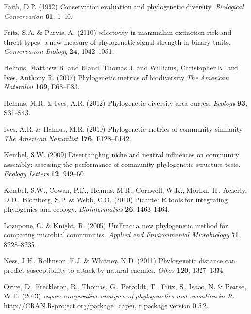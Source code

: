 \documentclass{bioinfo}
\begin{document}
\begin{thebibliography}{30}
Faith, D.P. (1992) Conservation evaluation and phylogenetic diversity.
  \emph{Biological Conservation} \textbf{61}, 1--10.

Fritz, S.A. \& Purvis, A. (2010) selectivity in mammalian extinction risk and
  threat types: a new measure of phylogenetic signal strength in binary traits.
  \emph{Conservation Biology} \textbf{24}, 1042--1051.

 Helmus, Matthew
  R. and Bland, Thomas J. and Williams, Christopher K. and Ives,
  Anthony R. (2007) Phylogenetic metrics of biodiversity \emph{The
    American Naturalist} \textbf{169}, E68--E83.

Helmus, M.R. \& Ives, A.R. (2012) Phylogenetic diversity-area curves.
  \emph{Ecology} \textbf{93}, S31--S43.

Ives, A.R. \& Helmus, M.R. (2010)
  Phylogenetic metrics of community similarity
  \emph{The American Naturalist} \textbf{176}, E128--E142.

Kembel, S.W. (2009) {Disentangling niche and neutral influences on community
  assembly: assessing the performance of community phylogenetic structure
  tests}. \emph{Ecology Letters} \textbf{12}, 949--60.

Kembel, S.W., Cowan, P.D., Helmus, M.R., Cornwell, W.K., Morlon, H., Ackerly,
  D.D., Blomberg, S.P. \& Webb, C.O. (2010) Picante: R tools for integrating
  phylogenies and ecology. \emph{Bioinformatics} \textbf{26}, 1463--1464.

Lozupone, C. \& Knight, R. (2005) {UniFrac}: a new phylogenetic method for
  comparing microbial communities. \emph{Applied and Environmental
  Microbiology} \textbf{71}, 8228--8235.

Ness, J.H., Rollinson, E.J. \& Whitney, K.D. (2011) Phylogenetic distance can
  predict susceptibility to attack by natural enemies. \emph{Oikos}
  \textbf{120}, 1327--1334.

Orme, D., Freckleton, R., Thomas, G., Petzoldt, T., Fritz, S., Isaac, N. \&
  Pearse, W.D. (2013) \emph{caper: comparative analyses of phylogenetics and
  evolution in {R}}. \urlprefix\url{http://CRAN.R-project.org/package=caper}, r
  package version 0.5.2.


\end{thebibliography}
\end{document}
